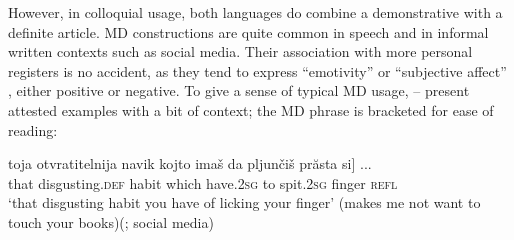 \documentclass[output=paper,
colorlinks,
citecolor=brown,
newtxmath
]{langscibook}
\begin{document}
\ea \label{Mperson}


\z
\z

\noindent However, in colloquial usage, both languages do combine a demonstrative with a definite article. MD constructions are quite common in speech and in informal written contexts such as social media. Their association with more personal registers is no accident, as they tend to express ``emotivity'' or ``subjective affect'' \citep{Friedman2019}, either positive or negative. To give a sense of typical MD usage, -- present attested examples with a bit of context; the MD phrase is bracketed for ease of reading:


\ea \label{Bmedia}
\ea \label{licking}
\gll \minsp{[} toja 	otvratitelnija navik kojto imaš 	da 	pljunčiš 	prăsta 	si] ...\\
{} that 	disgusting.\textsc{def} 	habit 	which 	have.\textsc{2sg} 	to 	spit.\textsc{2sg}	finger 	\textsc{refl} \\
\glt `that disgusting habit you have of licking your finger' (makes me not want to touch your books)\hfill (; social media)
\end{document}
